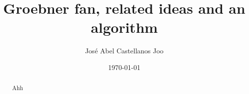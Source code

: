 \documentclass[a4paper, 11pt]{article}
\author{Jos\'e Abel Castellanos Joo}
\date{\today}
\title{Groebner fan, related ideas and an algorithm}
\begin{document}
\maketitle

\begin{abstract}
  Ahh
\end{abstract}






\end{document}
